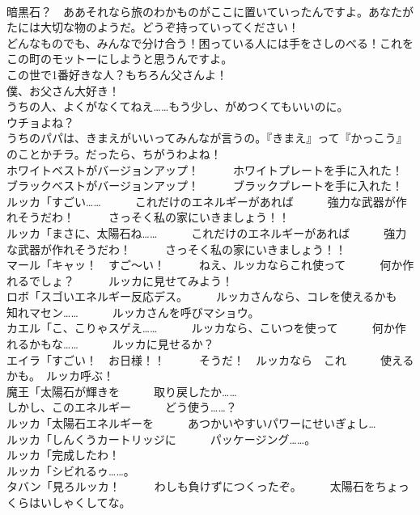 \documentclass[8pt]{extreport}
\begin{document}
\begin{CJK}{UTF8}{min}
\\	暗黒石？　ああそれなら旅のわかものがここに置いていったんですよ。あなたがたには大切な物のようだ。どうぞ持っていってください！	
\\	どんなものでも、みんなで分け合う！困っている人には手をさしのべる！これをこの町のモットーにしようと思うんですよ。	
\\	この世で1番好きな人？もちろん父さんよ！	
\\	僕、お父さん大好き！	
\\	うちの人、よくがなくてねえ……もう少し、がめつくてもいいのに。	
\\	ウチョよね？	
\\	うちのパパは、きまえがいいってみんなが言うの。『きまえ』って『かっこう』のことかチラ。だったら、ちがうわよね！	
\\	ホワイトベストがバージョンアップ！　　　ホワイトプレートを手に入れた！	
\\	ブラックベストがバージョンアップ！　　　ブラックプレートを手に入れた！	
\\	ルッカ「すごい……　　　これだけのエネルギーがあれば　　　強力な武器が作れそうだわ！　　　さっそく私の家にいきましょう！！	
\\	ルッカ「まさに、太陽石ね……　　　これだけのエネルギーがあれば　　　強力な武器が作れそうだわ！　　　さっそく私の家にいきましょう！！	
\\	マール「キャッ！　すご～い！　　　ねえ、ルッカならこれ使って　　　何か作れるでしょ？　　　ルッカに見せてみよう！	
\\	ロボ「スゴいエネルギー反応デス。　　　ルッカさんなら、コレを使えるかも　　　知れマセン……　　　ルッカさんを呼びマショウ。	
\\	カエル「こ、こりゃスゲえ……　　　ルッカなら、こいつを使って　　　何か作れるかもな……　　　ルッカに見せるか？	
\\	エイラ「すごい！　お日様！！　　　そうだ！　ルッカなら　これ　　　使えるかも。　ルッカ呼ぶ！	
\\	魔王「太陽石が輝きを　　　取り戻したか……	
\\	しかし、このエネルギー　　　どう使う……？	
\\	ルッカ「太陽石エネルギーを　　　あつかいやすいパワーにせいぎょし…	
\\	ルッカ「しんくうカートリッジに　　　パッケージング……。	
\\	ルッカ「完成したわ！	
\\	ルッカ「シビれるゥ……。	
\\	タバン「見ろルッカ！　　　わしも負けずにつくったぞ。　　　太陽石をちょっくらはいしゃくしてな。	

\end{CJK}
\end{document}
